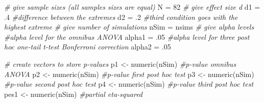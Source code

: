\documentclass[
]{book}
\newenvironment{Shaded}{\begin{snugshade}}{\end{snugshade}}
\newcommand{\CommentTok}[1]{\textcolor[rgb]{0.56,0.35,0.01}{\textit{#1}}}
\newcommand{\DecValTok}[1]{\textcolor[rgb]{0.00,0.00,0.81}{#1}}
\newcommand{\FunctionTok}[1]{\textcolor[rgb]{0.00,0.00,0.00}{#1}}
\newcommand{\NormalTok}[1]{#1}
\newcommand{\OtherTok}[1]{\textcolor[rgb]{0.56,0.35,0.01}{#1}}
\begin{document}
\begin{Shaded}
\begin{Highlighting}[]
\CommentTok{\# give sample sizes (all samples sizes are equal)}
\NormalTok{N }\OtherTok{=} \DecValTok{82}
\CommentTok{\# give effect size d}
\NormalTok{d1 }\OtherTok{=}\NormalTok{ .}\DecValTok{4} \CommentTok{\#difference between the extremes}
\NormalTok{d2 }\OtherTok{=}\NormalTok{ .}\DecValTok{2} \CommentTok{\#third condition goes with the highest extreme}
\CommentTok{\# give number of simulations}
\NormalTok{nSim }\OtherTok{=}\NormalTok{ nsims}
\CommentTok{\# give alpha levels}
\CommentTok{\#alpha level for the omnibus ANOVA}
\NormalTok{alpha1 }\OtherTok{=}\NormalTok{ .}\DecValTok{05} 
\CommentTok{\#alpha level for three post hoc one{-}tail t{-}test Bonferroni correction}
\NormalTok{alpha2 }\OtherTok{=}\NormalTok{ .}\DecValTok{05} 
\end{Highlighting}
\end{Shaded}

\begin{Shaded}
\begin{Highlighting}[]
\CommentTok{\# create vectors to store p{-}values}
\NormalTok{p1 }\OtherTok{\textless{}{-}} \FunctionTok{numeric}\NormalTok{(nSim) }\CommentTok{\#p{-}value omnibus ANOVA}
\NormalTok{p2 }\OtherTok{\textless{}{-}} \FunctionTok{numeric}\NormalTok{(nSim) }\CommentTok{\#p{-}value first post hoc test}
\NormalTok{p3 }\OtherTok{\textless{}{-}} \FunctionTok{numeric}\NormalTok{(nSim) }\CommentTok{\#p{-}value second post hoc test}
\NormalTok{p4 }\OtherTok{\textless{}{-}} \FunctionTok{numeric}\NormalTok{(nSim) }\CommentTok{\#p{-}value third post hoc test}
\NormalTok{pes1 }\OtherTok{\textless{}{-}} \FunctionTok{numeric}\NormalTok{(nSim) }\CommentTok{\#partial eta{-}squared}
\end{Highlighting}
\end{Shaded}
\end{document}
